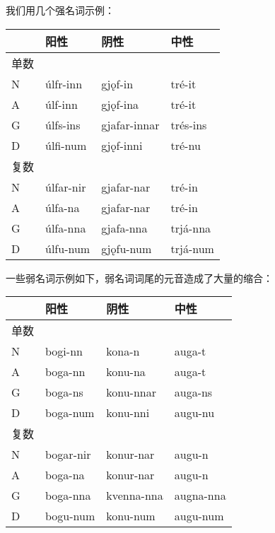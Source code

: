 我们用几个强名词示例：

\begin{longtable}{llll}
  \toprule
       & \textbf{阳性} & \textbf{阴性} & \textbf{中性} \\
  \midrule
  \endhead
  \bottomrule
  \endfoot
  单数 &               &               &               \\
  N    & úlfr-inn      & gjǫf-in       & tré-it        \\
  A    & úlf-inn       & gjǫf-ina      & tré-it        \\
  G    & úlfs-ins      & gjafar-innar  & trés-ins      \\
  D    & úlfi-num      & gjǫf-inni     & tré-nu        \\
  复数 &               &               &               \\
  N    & úlfar-nir     & gjafar-nar    & tré-in        \\
  A    & úlfa-na       & gjafar-nar    & tré-in        \\
  G    & úlfa-nna      & gjafa-nna     & trjá-nna      \\
  D    & úlfu-num      & gjǫfu-num     & trjá-num      \\
\end{longtable}

一些弱名词示例如下，弱名词词尾的元音造成了大量的缩合：

\begin{longtable}{llll}
  \toprule
       & \textbf{阳性} & \textbf{阴性} & \textbf{中性} \\
  \midrule
  \endhead
  \bottomrule
  \endfoot
  单数 &               &               &               \\
  N    & bogi-nn       & kona-n        & auga-t        \\
  A    & boga-nn       & konu-na       & auga-t        \\
  G    & boga-ns       & konu-nnar     & auga-ns       \\
  D    & boga-num      & konu-nni      & augu-nu       \\
  复数 &               &               &               \\
  N    & bogar-nir     & konur-nar     & augu-n        \\
  A    & boga-na       & konur-nar     & augu-n        \\
  G    & boga-nna      & kvenna-nna    & augna-nna     \\
  D    & bogu-num      & konu-num      & augu-num      \\
\end{longtable}

